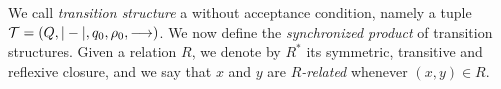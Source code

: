 \newcommand{\eq}[1]{#1}
\newcommand{\syncQ}{Q_{\syncp}}
\newcommand{\syncW}[1]{\weight{#1}_{\syncp}}
\newcommand{\syncAss}{\rho_0^{\syncp}}
\newcommand{\syncSt}{q_0^{\syncp}}
\newcommand{\syncTr}[1]{\xymatrix@C-=4ex{\ar[r]^{#1}&\!_{\syncp}}}
\newcommand{\syncHtr}[2]{\xymatrix@C-=4ex{\ar[r]^{#1}_{#2}&\!_{\syncp}}}
\newcommand{\regrule}{\textsc{(Reg)}}
\newcommand{\allrule}{\textsc{(Alloc)}}
\newcommand{\cproj}{\pi}

We call \emph{transition structure} a \hdma{} without acceptance condition, namely a tuple $\mathcal{T} = (Q,|-|,q_0,\rho_0,\longrightarrow)$. We now define the \emph{synchronized product} of transition structures.
Given a relation $R$, we denote by $R^*$ its symmetric, transitive and reflexive closure, and we say that $x$ and $y$ are \emph{$R$-related} whenever $(x,y) \in R$.


